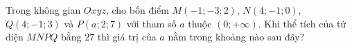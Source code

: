 \begin{ex}
Trong không gian $Oxyz$, cho bốn điểm $M(-1;-3;2)$, $N(4;-1;0)$, $Q(4;-1;3)$ và $P(a;2;7)$ với tham số $a$ thuộc $(0;+\infty)$. Khi thể tích của tứ diện $MNPQ$ bằng $27$ thì giá trị của $a$ nằm trong khoảng nào sau đây?
\end{ex}
